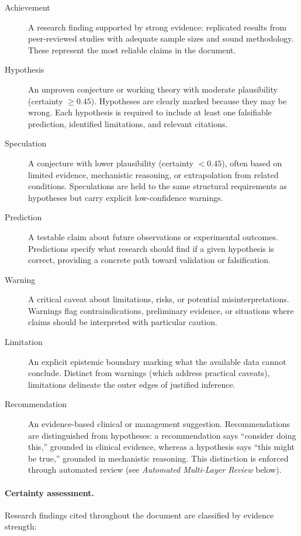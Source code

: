 \begin{description}
\item[Achievement] A research finding supported by strong evidence: replicated results from peer-reviewed studies with adequate sample sizes and sound methodology. These represent the most reliable claims in the document.

\item[Hypothesis] An unproven conjecture or working theory with moderate plausibility (certainty $\geq 0.45$). Hypotheses are clearly marked because they may be wrong. Each hypothesis is required to include at least one falsifiable prediction, identified limitations, and relevant citations.

\item[Speculation] A conjecture with lower plausibility (certainty $< 0.45$), often based on limited evidence, mechanistic reasoning, or extrapolation from related conditions. Speculations are held to the same structural requirements as hypotheses but carry explicit low-confidence warnings.

\item[Prediction] A testable claim about future observations or experimental outcomes. Predictions specify what research should find if a given hypothesis is correct, providing a concrete path toward validation or falsification.

\item[Warning] A critical caveat about limitations, risks, or potential misinterpretations. Warnings flag contraindications, preliminary evidence, or situations where claims should be interpreted with particular caution.

\item[Limitation] An explicit epistemic boundary marking what the available data cannot conclude. Distinct from warnings (which address practical caveats), limitations delineate the outer edges of justified inference.

\item[Recommendation] An evidence-based clinical or management suggestion. Recommendations are distinguished from hypotheses: a recommendation says ``consider doing this,'' grounded in clinical evidence, whereas a hypothesis says ``this might be true,'' grounded in mechanistic reasoning. This distinction is enforced through automated review (see \emph{Automated Multi-Layer Review} below).
\end{description}

\paragraph{Certainty assessment.}
Research findings cited throughout the document are classified by evidence strength:

